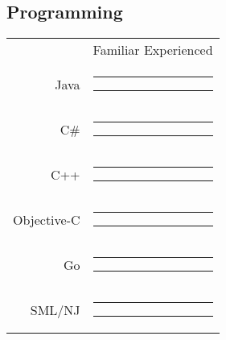 \documentclass[11pt]{article} 						%
\newcommand{\smpad}{\hspace*{.2em}}
\begin{document}
\begin{multicols}{2}
{{\begin{minipage}[t][\paperheight]{.38\textwidth}
\begin{minipage}[t][\paperheight]{.95\textwidth}
\subsection{\large\dotfill Programming\dotfill}
\vspace{-1ex}\hspace{3em}\normalsize
\begin{tabularx}{\textwidth}{@{}r@{}c@{}}
	\hfill & \footnotesize Familiar \hspace*{1.7em} Experienced\\
	Java \smpad&%
		\color{skillLvl}\rule[.25ex]{8em}{1ex}%
		\color{skillBkgd}\rule[.25ex]{2em}{1ex}\\
	C\# \smpad&%
		\color{skillLvl}\rule[.25ex]{7em}{1ex}%
		\color{skillBkgd}\rule[.25ex]{3em}{1ex}\\
	C++ \smpad&%
		\color{skillLvl}\rule[.25ex]{6em}{1ex}%
		\color{skillBkgd}\rule[.25ex]{4em}{1ex}\\
	Objective-C \smpad&%
		\color{skillLvl}\rule[.25ex]{5em}{1ex}%
		\color{skillBkgd}\rule[.25ex]{5em}{1ex}\\
	Go \smpad&%
		\color{skillLvl}\rule[.25ex]{4em}{1ex}%
		\color{skillBkgd}\rule[.25ex]{6em}{1ex}\\
	SML/NJ \smpad&%
		\color{skillLvl}\rule[.25ex]{3em}{1ex}%
		\color{skillBkgd}\rule[.25ex]{7em}{1ex}\\
\end{tabularx}

\end{minipage}
\end{minipage}}}
\end{multicols}
\end{document}
